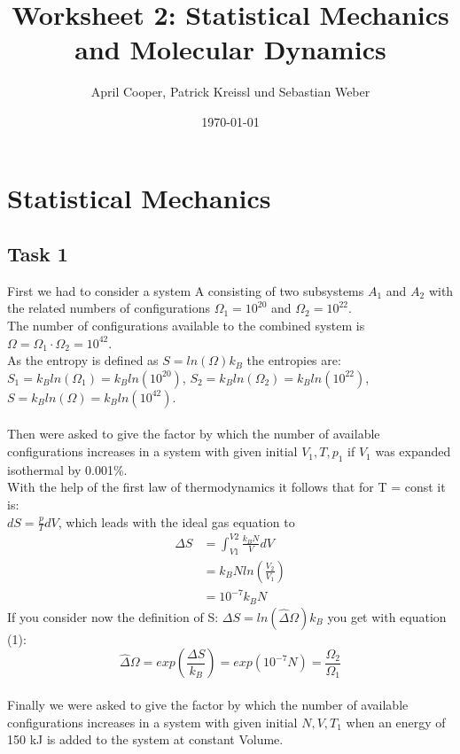 \documentclass[12pt,a4paper]{scrartcl}
\author{April Cooper, Patrick Kreissl und Sebastian Weber}
\title{Worksheet 2: Statistical Mechanics and Molecular Dynamics}
\date{\today}
\begin{document}
\maketitle
\tableofcontents
\newpage

\section{Statistical Mechanics}
\subsection{Task 1}
First we had to consider a system A consisting of two subsystems $A_1$ and $A_2$ with the related numbers of configurations $\Omega_1= 10^20$ and $\Omega_2=10^22$.\\
The number of configurations available to the combined system  is $\Omega=\Omega_1\cdot \Omega_2= 10^{42}$.\\
As the entropy is defined as $S = ln(\Omega)k_B$ the entropies are:\\
$S_1=k_B ln(\Omega_1)=k_B ln(10^{20})$,
$S_2=k_B ln(\Omega_2)=k_B ln(10^{22})$,
$S=k_B ln(\Omega)=k_B ln(10^{42})$.\\
\\
Then were asked to give the factor by which the number of available configurations increases in a system with given initial $V_1,T,p_1$ if $V_1$ was expanded isothermal by 0.001\%.
\\
With the help of the first law of thermodynamics  it follows that for T = const it is:\\
$dS=\frac{p}{T}dV$, which leads with the ideal gas equation to
 \begin{align}
 \Delta S&=\int_{V1}^{V2} \frac{k_BN}{V}dV\nonumber\\
  &= k_BNln\left(\frac{V_2}{V_1}\right)\nonumber\\
  &=10^{-7}k_BN
   \end{align}
  If you consider now the definition of S: $\Delta S = ln( \hat \Delta \Omega)k_B $ you get with equation (1):\\
 \[ \hat \Delta\Omega = exp(\frac{\Delta S}{k_B}) = exp(10^{-7}N)=\frac{\Omega_2}{\Omega_1}\]
 \\
 Finally we were asked to give the factor by which the number of available configurations increases in a system with given initial $N,V,T_1$ when an energy of 150 kJ is  added to the system at constant Volume.
\end{document}
